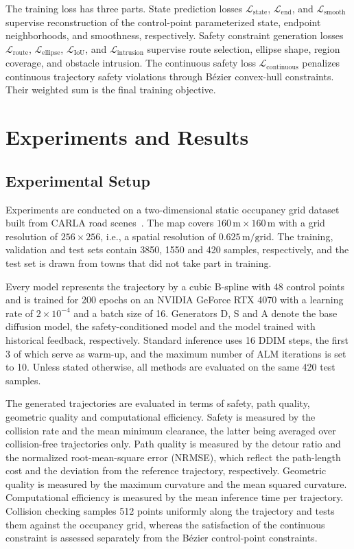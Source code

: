\documentclass[journal]{IEEEtran}
\begin{document}
The training loss has three parts. State prediction losses
$\mathcal L_{\mathrm{state}}$, $\mathcal L_{\mathrm{end}}$, and
$\mathcal L_{\mathrm{smooth}}$ supervise reconstruction of the control-point
parameterized state, endpoint neighborhoods, and smoothness, respectively.
Safety constraint generation losses $\mathcal L_{\mathrm{route}}$,
$\mathcal L_{\mathrm{ellipse}}$, $\mathcal L_{\mathrm{IoU}}$, and
$\mathcal L_{\mathrm{intrusion}}$ supervise route selection, ellipse shape,
region coverage, and obstacle intrusion. The continuous safety loss
$\mathcal L_{\mathrm{continuous}}$ penalizes continuous trajectory safety
violations through B\'ezier convex-hull constraints. Their weighted sum is
the final training objective.

\section{Experiments and Results}

\subsection{Experimental Setup}
Experiments are conducted on a two-dimensional static occupancy grid dataset
built from CARLA road scenes~\cite{carla}. The map covers
$160\,\mathrm{m}\times160\,\mathrm{m}$ with a grid resolution of $256\times256$,
i.e., a spatial resolution of $0.625\,\mathrm{m/grid}$. The training, validation
and test sets contain 3850, 1550 and 420 samples, respectively, and the test set
is drawn from towns that did not take part in training.

Every model represents the trajectory by a cubic B-spline with 48 control points
and is trained for 200 epochs on an NVIDIA GeForce RTX 4070 with a learning rate
of $2\times10^{-4}$ and a batch size of 16. Generators D, S and A denote the base
diffusion model, the safety-conditioned model and the model trained with
historical feedback, respectively. Standard inference uses 16 DDIM steps, the
first 3 of which serve as warm-up, and the maximum number of ALM iterations is
set to 10. Unless stated otherwise, all methods are evaluated on the same 420
test samples.

The generated trajectories are evaluated in terms of safety, path quality,
geometric quality and computational efficiency. Safety is measured by the
collision rate and the mean minimum clearance, the latter being averaged over
collision-free trajectories only. Path quality is measured by the detour ratio
and the normalized root-mean-square error (NRMSE), which reflect the path-length
cost and the deviation from the reference trajectory, respectively. Geometric
quality is measured by the maximum curvature and the mean squared curvature.
Computational efficiency is measured by the mean inference time per trajectory.
Collision checking samples 512 points uniformly along the trajectory and tests
them against the occupancy grid, whereas the satisfaction of the continuous
constraint is assessed separately from the B\'ezier control-point constraints.
\end{document}
